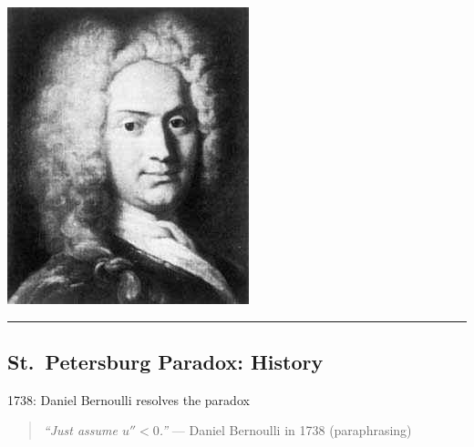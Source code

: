 \documentclass[
  letterpaper,
  DIV=11,
  numbers=noendperiod]{scrartcl}
\begin{document}
\includegraphics[width=0.8\linewidth,height=\textheight,keepaspectratio]{figures/NBernoulli.jpeg}

\begin{center}\rule{0.5\linewidth}{0.5pt}\end{center}

\subsection{St.~Petersburg Paradox:
History}\label{st.-petersburg-paradox-history-3}

1738: Daniel Bernoulli resolves the paradox

\begin{quote}
\emph{``Just assume \(u'' < 0\).''} --- Daniel Bernoulli in 1738
(paraphrasing)
\end{quote}
\end{document}
